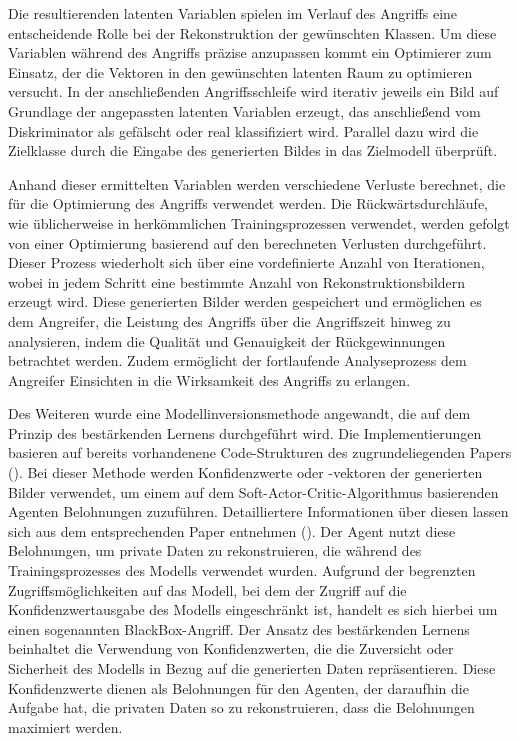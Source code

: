 Die resultierenden latenten Variablen spielen im Verlauf des Angriffs eine entscheidende Rolle bei der Rekonstruktion der gewünschten Klassen. Um diese Variablen während des Angriffs präzise anzupassen kommt ein Optimierer zum Einsatz, der die Vektoren in den gewünschten latenten Raum zu optimieren versucht. In der anschließenden Angriffsschleife wird iterativ jeweils ein Bild auf Grundlage der angepassten latenten Variablen erzeugt, das anschließend vom Diskriminator als gefälscht oder real klassifiziert wird. Parallel dazu wird die Zielklasse durch die Eingabe des generierten Bildes in das Zielmodell überprüft.

Anhand dieser ermittelten Variablen werden verschiedene Verluste berechnet, die für die Optimierung des Angriffs verwendet werden. Die Rückwärtsdurchläufe, wie üblicherweise in herkömmlichen Trainingsprozessen verwendet, werden gefolgt von einer Optimierung basierend auf den berechneten Verlusten durchgeführt. Dieser Prozess wiederholt sich über eine vordefinierte Anzahl von Iterationen, wobei in jedem Schritt eine bestimmte Anzahl von Rekonstruktionsbildern erzeugt wird. Diese generierten Bilder werden gespeichert und ermöglichen es dem Angreifer, die Leistung des Angriffs über die Angriffszeit hinweg zu analysieren, indem die Qualität und Genauigkeit der Rückgewinnungen betrachtet werden. Zudem ermöglicht der fortlaufende Analyseprozess dem Angreifer Einsichten in die Wirksamkeit des Angriffs zu erlangen.

Des Weiteren wurde eine Modellinversionsmethode angewandt, die auf dem Prinzip des bestärkenden Lernens durchgeführt wird. Die Implementierungen basieren auf bereits vorhandenene Code-Strukturen des zugrundeliegenden Papers (\cite{han_reinforcement_2023}). Bei dieser Methode werden Konfidenzwerte oder -vektoren der generierten Bilder verwendet, um einem  auf dem \glqq Soft-Actor-Critic-Algorithmus\grqq{} basierenden Agenten Belohnungen zuzuführen. Detailliertere Informationen über diesen lassen sich aus dem entsprechenden Paper entnehmen (\cite{haarnoja_soft_2019}). Der Agent nutzt diese Belohnungen, um private Daten zu rekonstruieren, die während des Trainingsprozesses des Modells verwendet wurden. Aufgrund der begrenzten Zugriffsmöglichkeiten auf das Modell, bei dem der Zugriff auf die Konfidenzwertausgabe des Modells eingeschränkt ist, handelt es sich hierbei um einen sogenannten BlackBox-Angriff.
Der Ansatz des bestärkenden Lernens beinhaltet die Verwendung von Konfidenzwerten, die die Zuversicht oder Sicherheit des Modells in Bezug auf die generierten Daten repräsentieren. Diese Konfidenzwerte dienen als Belohnungen für den Agenten, der daraufhin die Aufgabe hat, die privaten Daten so zu rekonstruieren, dass die Belohnungen maximiert werden.

